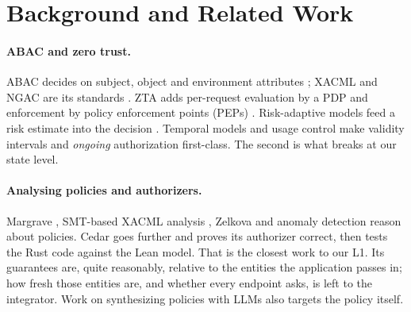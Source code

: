 \documentclass[sigconf,review,anonymous]{acmart}
\begin{document}
\section{Background and Related Work}
\label{sec:related}

\paragraph{ABAC and zero trust.} ABAC decides on subject, object and environment attributes
\cite{hu2014sp800162,jin2012abac}; XACML and NGAC are its standards \cite{oasis2013xacml,ferraiolo2016sp800178}.
ZTA adds per-request evaluation by a PDP and enforcement by policy enforcement points (PEPs)
\cite{rose2020zta,chandramouli2023sp800207a,kerman2025sp180035}. Risk-adaptive models feed a risk estimate
into the decision \cite{cheng2007fuzzymls,ameer2022bluesky}. Temporal models and usage control
\cite{bertino2001trbac,park2004ucon} make validity intervals and \emph{ongoing} authorization first-class. The
second is what breaks at our state level.

\paragraph{Analysing policies and authorizers.} Margrave \cite{fisler2005margrave}, SMT-based XACML analysis
\cite{turkmen2017xacmlsmt}, Zelkova \cite{backes2018zelkova} and anomaly detection \cite{hu2011anomaly} reason
about policies. Cedar \cite{cutler2024cedar,disselkoen2024vgd} goes further and proves its authorizer correct,
then tests the Rust code against the Lean model. That is the closest work to our L1. Its guarantees are,
quite reasonably, relative to the entities the application passes in; how fresh those entities are, and
whether every endpoint asks, is left to the integrator. Work on synthesizing policies with LLMs
\cite{vatsa2025synth,vatsa2026autocedar} also targets the policy itself.
\end{document}
